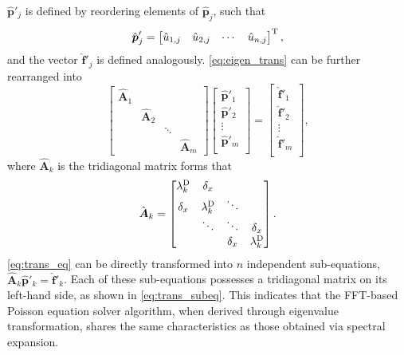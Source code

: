\documentclass[preprint]{elsarticle}
\begin{document}
$\hat{\boldsymbol{p}}'_j$ is defined by reordering elements of $\hat{\boldsymbol{p}}_j$, such that
\begin{equation}
    \label{eq:trans_order}
    \hat{\boldsymbol{p}}'_j=\left[\begin{matrix}
        \hat{u}_{1,j} & \hat{u}_{2,j} & \cdots & \hat{u}_{n,j}
    \end{matrix}\right]^{\rm T},
\end{equation}
and the vector $\hat{\boldsymbol{f}}'_j$ is defined analogously. \eqref{eq:eigen_trans} can be further rearranged into
\begin{equation}
    \label{eq:trans_eq}
    \left[\begin{matrix}
        \hat{\boldsymbol{A}}_1\\
        &\hat{\boldsymbol{A}}_2\\
        &&\ddots\\
        &&&\hat{\boldsymbol{A}}_m
    \end{matrix}\right]
    \left[\begin{matrix}
        \hat{\boldsymbol{p}}'_1\\
        \hat{\boldsymbol{p}}'_2\\
        \vdots\\
        \hat{\boldsymbol{p}}'_m\\
    \end{matrix}\right]
    =\left[\begin{matrix}
        \hat{\boldsymbol{f}}'_1\\
        \hat{\boldsymbol{f}}'_2\\
        \vdots\\
        \hat{\boldsymbol{f}}'_m\\
    \end{matrix}\right],
\end{equation}
where $\hat{\boldsymbol{A}}_k$ is the tridiagonal matrix forms that
\begin{equation}
    \label{eq:trans_subeq}
    \hat{\boldsymbol{A}}_k=
    \left[\begin{matrix}
        \lambda_k^{\rm D} & \delta_x \\
        \delta_x & \lambda_k^{\rm D} & \ddots \\
        & \ddots & \ddots & \delta_x \\
        & & \delta_x & \lambda_k^{\rm D}
    \end{matrix}\right].
\end{equation}
\eqref{eq:trans_eq} can be directly transformed into $n$ independent sub-equations, $\hat{\boldsymbol{A}}_k\hat{\boldsymbol{p}}'_k=\hat{\boldsymbol{f}}'_k$. Each of these sub-equations possesses a tridiagonal matrix on its left-hand side, as shown in \eqref{eq:trans_subeq}. This indicates that the FFT-based Poisson equation solver algorithm, when derived through eigenvalue transformation, shares the same characteristics as those obtained via spectral expansion.
\end{document}
